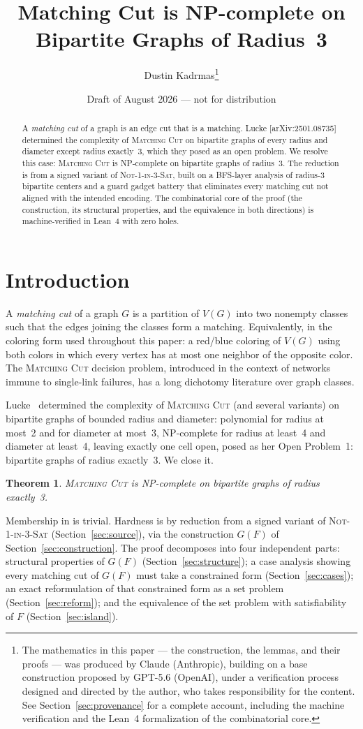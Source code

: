 \documentclass[11pt]{article}
\title{Matching Cut is NP-complete on Bipartite Graphs of Radius~3}
\author{Dustin Kadrmas\thanks{The mathematics in this paper --- the
construction, the lemmas, and their proofs --- was produced by Claude
(Anthropic), building on a base construction proposed by GPT-5.6
(OpenAI), under a verification process designed and directed by the
author, who takes responsibility for the content. See
Section~\ref{sec:provenance} for a complete account, including the
machine verification and the Lean~4 formalization of the combinatorial
core.}}
\date{Draft of August 2026 --- not for distribution}
\newtheorem{theorem}{Theorem}
\newcommand{\NP}{\mathsf{NP}}
\begin{document}
\maketitle

\begin{abstract}
A \emph{matching cut} of a graph is an edge cut that is a matching.
Lucke
[arXiv:2501.08735] determined the complexity of \textsc{Matching Cut}
on bipartite graphs of every radius and diameter except radius
exactly~3, which they posed as an open problem. We resolve this case:
\textsc{Matching Cut} is NP-complete on bipartite graphs of radius~3.
The reduction is from a signed variant of \textsc{Not-1-in-3-Sat},
built on a BFS-layer analysis of radius-3 bipartite centers and a
guard gadget battery that eliminates every matching cut not aligned
with the intended encoding. The combinatorial core of the proof (the
construction, its structural properties, and the equivalence in both
directions) is machine-verified in Lean~4 with zero holes.
\end{abstract}

\section{Introduction}

A \emph{matching cut} of a graph $G$ is a partition of $V(G)$ into two
nonempty classes such that the edges joining the classes form a
matching. Equivalently, in the coloring form used throughout this
paper: a red/blue coloring of $V(G)$ using both colors in which
every vertex has at most one neighbor of the opposite color. The
\textsc{Matching Cut} decision problem, introduced in the context of
networks immune to single-link failures, has a long dichotomy
literature over graph classes.

Lucke~\cite{Lucke25} determined the
complexity of \textsc{Matching Cut} (and several variants) on
bipartite graphs of bounded radius and diameter: polynomial for radius
at most~2 and for diameter at most~3, NP-complete for radius at
least~4 and diameter at least~4, leaving exactly one cell open, posed
as her Open Problem~1: bipartite graphs of radius exactly~3. We
close it.

\begin{theorem}\label{thm:main}
\textsc{Matching Cut} is NP-complete on bipartite graphs of radius
exactly~3.
\end{theorem}

Membership in \NP{} is trivial. Hardness is by reduction from a
signed variant of \textsc{Not-1-in-3-Sat} (Section~\ref{sec:source}),
via the construction $G(F)$ of Section~\ref{sec:construction}. The
proof decomposes into four independent parts: structural properties
of $G(F)$ (Section~\ref{sec:structure}); a case analysis showing every
matching cut of $G(F)$ must take a constrained form
(Section~\ref{sec:cases}); an exact reformulation of that constrained
form as a set problem (Section~\ref{sec:reform}); and the equivalence
of the set problem with satisfiability of $F$
(Section~\ref{sec:island}).
\end{document}
